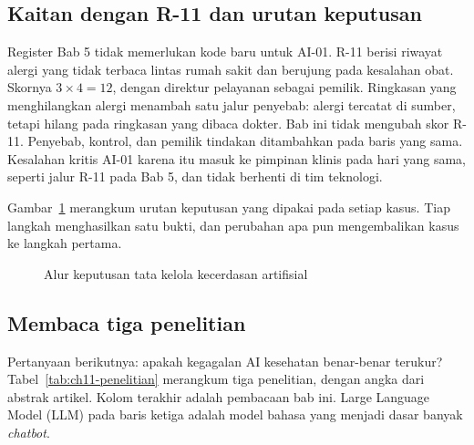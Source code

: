 \subsection*{Kaitan dengan R-11 dan urutan keputusan}

Register Bab 5 tidak memerlukan kode baru untuk AI-01. R-11 berisi riwayat alergi yang tidak
terbaca lintas rumah sakit dan berujung pada kesalahan obat. Skornya $3 \times 4 = 12$, dengan
direktur pelayanan sebagai pemilik. Ringkasan yang menghilangkan alergi menambah satu jalur
penyebab: alergi tercatat di sumber, tetapi hilang pada ringkasan yang dibaca dokter. Bab ini tidak
mengubah skor R-11. Penyebab, kontrol, dan pemilik tindakan ditambahkan pada baris yang sama.
Kesalahan kritis AI-01 karena itu masuk ke pimpinan klinis pada hari yang sama, seperti jalur R-11
pada Bab 5, dan tidak berhenti di tim teknologi.

Gambar~\ref{fig:ch11-alur} merangkum urutan keputusan yang dipakai pada setiap kasus. Tiap langkah
menghasilkan satu bukti, dan perubahan apa pun mengembalikan kasus ke langkah pertama.

\begin{figure}[!htb]
  \centering
  
  \caption{Alur keputusan tata kelola kecerdasan artifisial}
  \label{fig:ch11-alur}
\end{figure}

\subsection*{Membaca tiga penelitian}

Pertanyaan berikutnya: apakah kegagalan AI kesehatan benar-benar terukur?
Tabel~\ref{tab:ch11-penelitian} merangkum tiga penelitian, dengan angka dari abstrak artikel. Kolom
terakhir adalah pembacaan bab ini. Large Language Model (LLM) pada baris ketiga adalah model bahasa
yang menjadi dasar banyak \textit{chatbot}.

